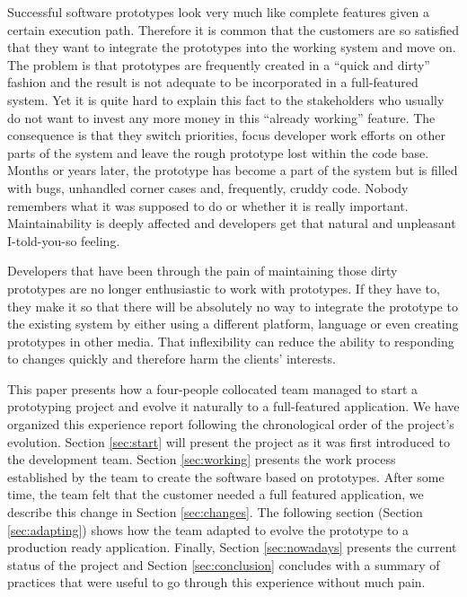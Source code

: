 \documentclass[lnbip]{svmultln}
\begin{document}
Successful software prototypes look very much like complete features
given a certain execution path. Therefore it is common that the
customers are so satisfied that they want to integrate the prototypes
into the working system and move on. The problem is that prototypes
are frequently created in a ``quick and dirty'' fashion and the result
is not adequate to be incorporated in a full-featured system. Yet it
is quite hard to explain this fact to the stakeholders who usually do
not want to invest any more money in this ``already working''
feature. The consequence is that they switch priorities, focus
developer work efforts on other parts of the system and leave the
rough prototype lost within the code base. Months or years later, the
prototype has become a part of the system but is filled with bugs,
unhandled corner cases and, frequently, cruddy code. Nobody remembers
what it was supposed to do or whether it is really
important. Maintainability is deeply affected and developers get that
natural and unpleasant I-told-you-so feeling. %

Developers that have been through the pain of maintaining those dirty
prototypes are no longer enthusiastic to work with prototypes. If they
have to, they make it so that there will be absolutely no way to
integrate the prototype to the existing system by either using a
different platform, language or even creating prototypes in other
media. That inflexibility can reduce the ability to responding to
changes quickly and therefore harm the clients' interests.

This paper presents how a four-people collocated team managed to start
a prototyping project and evolve it naturally to a full-featured
application.  We have organized this experience report following the
chronological order of the project's evolution. Section
\ref{sec:start} will present the project as it was first introduced to
the development team. Section \ref{sec:working} presents the work
process established by the team to create the software based on
prototypes. After some time, the team felt that the customer needed a
full featured application, we describe this change in Section
\ref{sec:changes}. The following section (Section \ref{sec:adapting})
shows how the team adapted to evolve the prototype to a production
ready application. Finally, Section \ref{sec:nowadays} presents the
current status of the project and Section \ref{sec:conclusion}
concludes with a summary of practices that were useful to go through
this experience without much pain.
\end{document}
